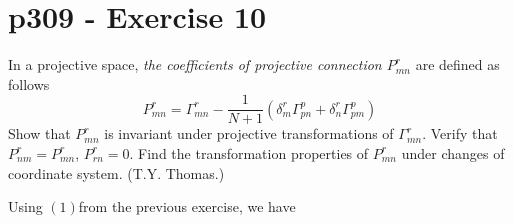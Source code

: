 


\section{p309 - Exercise 10}
\begin{tcolorbox}
In a projective space, \textit{the coefficients of projective connection $P^{r}_{mn}$ }are defined as follows
$$P^{r}_{mn} = \Gamma ^{r}_{mn}-\frac{1}{N+1}\left(\delta^r_m \Gamma^p_{pn}+  \delta^r_n \Gamma^p_{pm} \right)$$
Show that $P^{r}_{mn} $ is invariant under projective transformations of $\Gamma^{r}_{mn}$. Verify that $P^{r}_{nm}=P^{r}_{mn}$, $P^{r}_{rn}=0$. Find the transformation properties of $P^{r}_{mn}$ under changes of coordinate system. (T.Y. Thomas.)
\end{tcolorbox}
Using $(1)$from the previous exercise, we have

